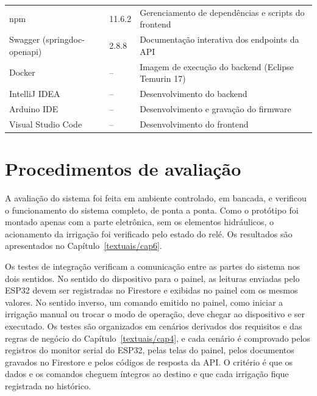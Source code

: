 \begin{table}[htbp]
\begin{tabularx}{\textwidth}{@{} l l X @{}}
    npm                     & 11.6.2 & Gerenciamento de dependências e scripts do frontend \\
    Swagger (springdoc-openapi) & 2.8.8 & Documentação interativa dos endpoints da API \\
    Docker                  & --     & Imagem de execução do backend (Eclipse Temurin 17) \\
    IntelliJ IDEA           & --     & Desenvolvimento do backend \\
    Arduino IDE           & --     & Desenvolvimento e gravação do firmware \\ %
    Visual Studio Code    & --     & Desenvolvimento do frontend \\           %
    \bottomrule
  \end{tabularx}
\end{table}

\section{Procedimentos de avaliação}
\label{sec:avaliacao}

A avaliação do sistema foi feita em ambiente controlado, em bancada, e verificou o funcionamento do sistema completo, de ponta a ponta. Como o protótipo foi montado apenas com a parte eletrônica, sem os elementos hidráulicos, o acionamento da irrigação foi verificado pelo estado do relé. Os resultados são apresentados no Capítulo~\ref{textuais/cap6}.
 
Os testes de integração verificam a comunicação entre as partes do sistema nos dois sentidos. No sentido do dispositivo para o painel, as leituras enviadas pelo ESP32 devem ser registradas no Firestore e exibidas no painel com os mesmos valores. No sentido inverso, um comando emitido no painel, como iniciar a irrigação manual ou trocar o modo de operação, deve chegar ao dispositivo e ser executado. Os testes são organizados em cenários derivados dos requisitos e das regras de negócio do Capítulo~\ref{textuais/cap4}, e cada cenário é comprovado pelos registros do monitor serial do ESP32, pelas telas do painel, pelos documentos gravados no Firestore e pelos códigos de resposta da API. O critério é que os dados e os comandos cheguem íntegros ao destino e que cada irrigação fique registrada no histórico.